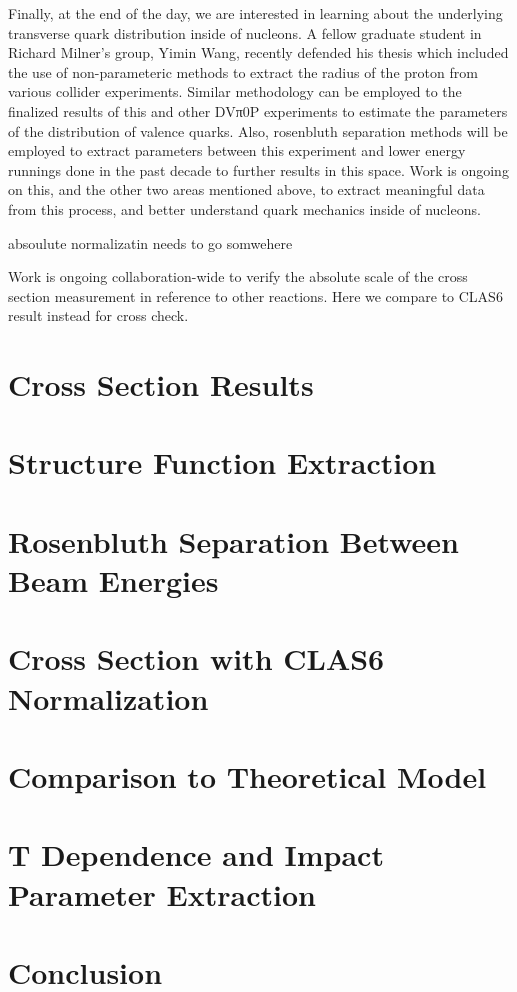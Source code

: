 Finally, at the end of the day, we are interested in learning about the underlying transverse quark distribution inside of
nucleons. A fellow graduate student in Richard Milner’s group, Yimin Wang, recently defended his thesis which included the
use of non-parameteric methods to extract the radius of the proton from various collider experiments. Similar methodology
can be employed to the finalized results of this and other DVπ0P experiments to estimate the parameters of the distribution
of valence quarks. Also, rosenbluth separation methods will be employed to extract parameters between this experiment and
lower energy runnings done in the past decade to further results in this space. Work is ongoing on this, and the other two areas
mentioned above, to extract meaningful data from this process, and better understand quark mechanics inside of nucleons.

absoulute normalizatin needs to go somwehere

Work is ongoing collaboration-wide to verify the absolute scale of the cross section measurement in reference to other reactions. Here we compare to CLAS6 result instead for cross check. 

\section{Cross Section Results}
    

\section{Structure Function Extraction}
    
    
\section{Rosenbluth Separation Between Beam Energies}
    
    
\section{Cross Section with CLAS6 Normalization}
    

\section{Comparison to Theoretical Model}
    
    
\section{T Dependence and Impact Parameter Extraction}
    

\section{Conclusion}
    











